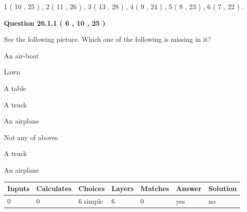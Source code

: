 \documentclass[12pt]{article}
\begin{document}
  
             1 (          10 ,          25 )
 ,
             2 (          11 ,          26 )
 ,
             3 (          13 ,          28 )
 ,
             4 (           9 ,          24 )
 ,
             5 (           8 ,          23 )
 ,
             6 (           7 ,          22 )
 .
  
\vspace{0.2in}
  
{\textbf{\Large{Question
26.1.1 
 (           6 ,          10 ,          25 )
}}}
  
  
See the following picture.
Which one of the following is missing in it?
 
 
An air-boat
 
 
Lawn
 
 
A table
 
 
A truck
 
 
An airplane
 
 
  Not any of aboves.
 
 
\noindent{}
 
 
A truck
 
 
An airplane
 
 
\noindent{}
 
 
 
\vspace{0.3in}
   
   
   
   
\noindent\begin{tabular}{|l|l|l|l|l|l|l|}
 \hline
Inputs & Calculates & Choices & Layers & Matches & Answer & Solution \\ \hline
           0  & 
           0  & 
           6
  simple  
  & 
           6  & 
           0  & 
  yes & 
  no 
  \\ \hline
 \end{tabular}
   
   
   
   
\noindent{}
   
   
   
\end{document}
